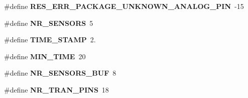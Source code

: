 \begin{DoxyCompactItemize}
\item 
\hypertarget{group___engduino_protocol_ga0f4162a192aa035eb7e1def41bf7436b}{}\#define {\bfseries R\+E\+S\+\_\+\+E\+R\+R\+\_\+\+P\+A\+C\+K\+A\+G\+E\+\_\+\+U\+N\+K\+N\+O\+W\+N\+\_\+\+A\+N\+A\+L\+O\+G\+\_\+\+P\+I\+N}~-\/15\label{group___engduino_protocol_ga0f4162a192aa035eb7e1def41bf7436b}

\item 
\hypertarget{group___engduino_protocol_ga9ad2924bf54683250fdad58e707b4f98}{}\#define {\bfseries N\+R\+\_\+\+S\+E\+N\+S\+O\+R\+S}~5\label{group___engduino_protocol_ga9ad2924bf54683250fdad58e707b4f98}

\item 
\hypertarget{group___engduino_protocol_ga5a63bf5566f66e30f56bc17eea0e5e4b}{}\#define {\bfseries T\+I\+M\+E\+\_\+\+S\+T\+A\+M\+P}~2.\label{group___engduino_protocol_ga5a63bf5566f66e30f56bc17eea0e5e4b}

\item 
\hypertarget{group___engduino_protocol_ga2cb9809f30ffec513e731194339f2ca4}{}\#define {\bfseries M\+I\+N\+\_\+\+T\+I\+M\+E}~20\label{group___engduino_protocol_ga2cb9809f30ffec513e731194339f2ca4}

\item 
\hypertarget{group___engduino_protocol_gafa4995446d830ed56e3c1a00e3b8f6ef}{}\#define {\bfseries N\+R\+\_\+\+S\+E\+N\+S\+O\+R\+S\+\_\+\+B\+U\+F}~8\label{group___engduino_protocol_gafa4995446d830ed56e3c1a00e3b8f6ef}

\item 
\hypertarget{group___engduino_protocol_ga52733ee86a38f356ae77e92d5e0d5979}{}\#define {\bfseries N\+R\+\_\+\+T\+R\+A\+N\+\_\+\+P\+I\+N\+S}~18\label{group___engduino_protocol_ga52733ee86a38f356ae77e92d5e0d5979}

\end{DoxyCompactItemize}
